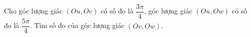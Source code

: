 \begin{bt}%
	Cho góc lượng giác $(Ou,Ov)$ có số đo là $\dfrac{3\pi}{4}$, góc lượng giác $(Ou,Ow)$ có số đo là $\dfrac{5\pi}{4}$. Tìm số đo của góc lượng giác $(Ov,Ow)$.
\end{bt}

